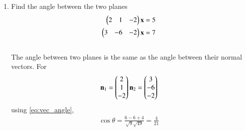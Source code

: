 \begin{enumerate}[label=\thesubsection.\arabic*.,ref=\thesubsection.\theenumi]
\item  Find the angle between the two planes 
\begin{align}
\begin{pmatrix} 2 & 1 & -2\end{pmatrix}\mathbf{x} &=5
\\
\begin{pmatrix} 3 & -6 & -2\end{pmatrix}\mathbf{x} &=7
\end{align}
\\
\solution
The angle between two planes is the same as the angle between their normal vectors.  For 
\begin{align}
\mathbf{n}_1 = \begin{pmatrix} 2 \\ 1 \\ -2\end{pmatrix}
\mathbf{n}_2 = \begin{pmatrix} 3 \\ -6 \\ -2\end{pmatrix}
\end{align}
using \eqref{eq:vec_angle}, 
\begin{align}
\cos \theta = \frac{6-6+4}{\sqrt{9}\sqrt{49}} = \frac{4}{21}
\end{align}
\end{enumerate}


